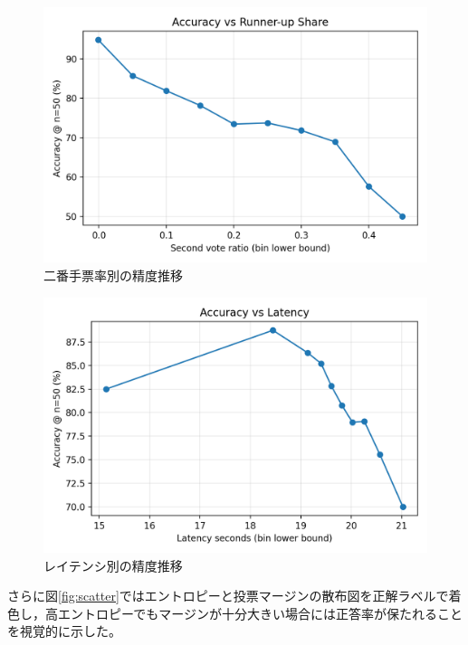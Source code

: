 \documentclass{ipsj}
\begin{document}
\begin{figure}[tb]
  \centering
  \includegraphics[width=0.8\linewidth]{../../figures/n50_batch/accuracy_vs_second_vote.png}
  \caption{二番手票率別の精度推移}
  \label{fig:second}
\end{figure}

\begin{figure}[tb]
  \centering
  \includegraphics[width=0.8\linewidth]{../../figures/n50_batch/accuracy_vs_latency.png}
  \caption{レイテンシ別の精度推移}
  \label{fig:latency}
\end{figure}

さらに図\ref{fig:scatter}ではエントロピーと投票マージンの散布図を正解ラベルで着色し，高エントロピーでもマージンが十分大きい場合には正答率が保たれることを視覚的に示した。
\end{document}
